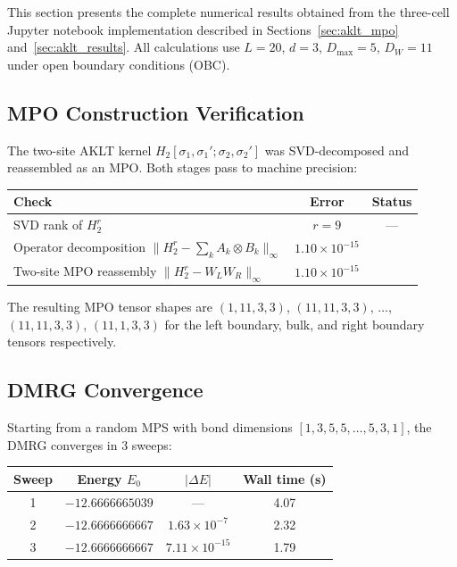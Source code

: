 \documentclass[aps,prb,onecolumn,scriptaddress]{revtex4-2}
\begin{document}
This section presents the complete numerical results obtained from the
three-cell Jupyter notebook implementation described in
Sections~\ref{sec:aklt_mpo} and~\ref{sec:aklt_results}.
All calculations use $L=20$, $d=3$, $D_{\max}=5$, $D_W=11$
under open boundary conditions (OBC).

\subsection{MPO Construction Verification}

The two-site AKLT kernel $H_2[\sigma_1,\sigma_1';\sigma_2,\sigma_2']$
was SVD-decomposed and reassembled as an MPO.
Both stages pass to machine precision:

\begin{center}
	\begin{tabular}{lcc}
		\toprule
		Check & Error & Status \\
		\midrule
		SVD rank of $H_2^r$ & $r = 9$ & --- \\
		Operator decomposition
		$\|H_2^r - \sum_k A_k \otimes B_k\|_\infty$ &
		$1.10\times10^{-15}$ & \checkmark \\
		Two-site MPO reassembly $\|H_2^r - W_L W_R\|_\infty$ &
		$1.10\times10^{-15}$ & \checkmark \\
		\bottomrule
	\end{tabular}
\end{center}

The resulting MPO tensor shapes are
$(1,11,3,3)$, $(11,11,3,3)$, $\ldots$, $(11,11,3,3)$, $(11,1,3,3)$
for the left boundary, bulk, and right boundary tensors respectively.

\subsection{DMRG Convergence}

Starting from a random MPS with bond dimensions
$[1,3,5,5,\ldots,5,3,1]$, the DMRG converges in 3 sweeps:

\begin{center}
	\begin{tabular}{cccc}
		\toprule
		Sweep & Energy $E_0$ & $|\Delta E|$ & Wall time (s) \\
		\midrule
		1 & $-12.6666665039$ & --- & 4.07 \\
		2 & $-12.6666666667$ & $1.63\times10^{-7}$ & 2.32 \\
		3 & $-12.6666666667$ & $7.11\times10^{-15}$ & 1.79 \\
		\bottomrule
	\end{tabular}
\end{center}
\end{document}
